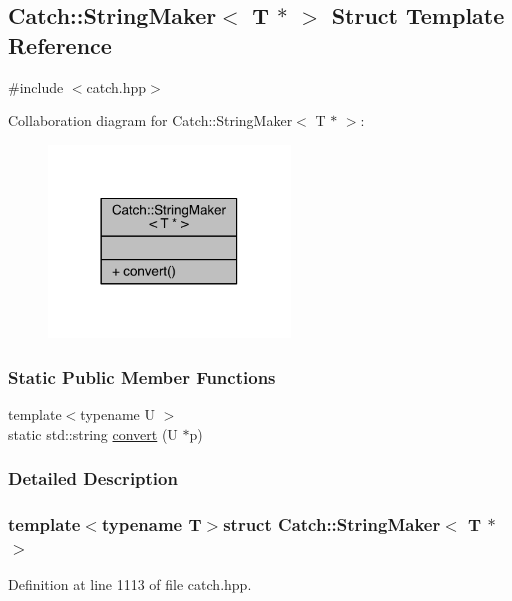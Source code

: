 \hypertarget{a00081}{}\subsection{Catch\+:\+:String\+Maker$<$ T $\ast$ $>$ Struct Template Reference}
\label{a00081}


{\ttfamily \#include $<$catch.\+hpp$>$}



Collaboration diagram for Catch\+:\+:String\+Maker$<$ T $\ast$ $>$\+:\nopagebreak
\begin{figure}[H]
\begin{center}
\leavevmode
\includegraphics[width=182pt]{a00279}
\end{center}
\end{figure}
\subsubsection*{Static Public Member Functions}
\begin{DoxyCompactItemize}
\item 
{\footnotesize template$<$typename U $>$ }\\static std\+::string \hyperlink{a00081_a2adbc75c99d71b8323f4052bcb0815c9}{convert} (U $\ast$p)
\end{DoxyCompactItemize}


\subsubsection{Detailed Description}
\subsubsection*{template$<$typename T$>$struct Catch\+::\+String\+Maker$<$ T $\ast$ $>$}



Definition at line 1113 of file catch.\+hpp.



